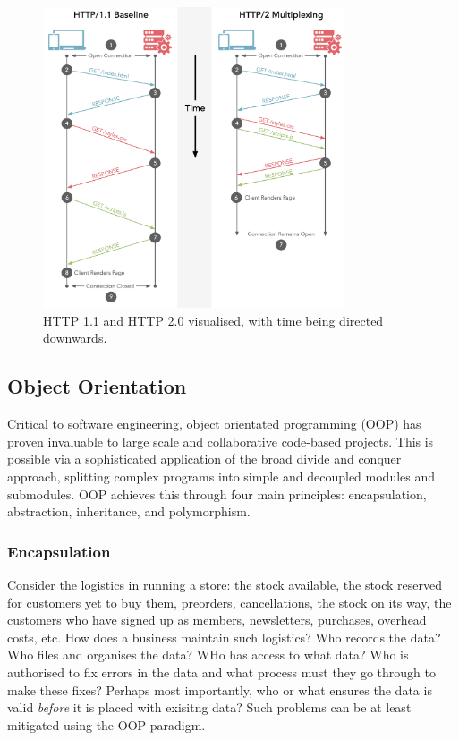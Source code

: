\documentclass[11pt]{article}
\begin{document}
\begin{figure}[h!]
    \centering
    \includegraphics[width=0.8\textwidth]{figures/http1-vs-http2-multiplexing.png}
    \caption{HTTP 1.1 and HTTP 2.0 visualised, with time being directed downwards.}
    \label{fig:http-visualised}
\end{figure}

\subsection{Object Orientation}

Critical to software engineering, object orientated programming (OOP) has proven invaluable to large scale and collaborative code-based projects. This is possible via a sophisticated application of the broad divide and conquer approach, splitting complex programs into simple and decoupled modules and submodules. OOP achieves this through four main principles: encapsulation, abstraction, inheritance, and polymorphism.

\subsubsection{Encapsulation}

Consider the logistics in running a store: the stock available, the stock reserved for customers yet to buy them, preorders, cancellations, the stock on its way, the customers who have signed up as members, newsletters, purchases, overhead costs, etc. How does a business maintain such logistics? Who records the data? Who files and organises the data? WHo has access to what data? Who is authorised to fix errors in the data and what process must they go through to make these fixes? Perhaps most importantly, who or what ensures the data is valid \textit{before} it is placed with exisitng data? Such problems can be at least mitigated using the OOP paradigm.
\end{document}

